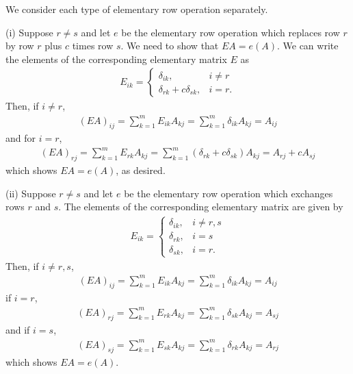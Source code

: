 \documentclass[12pt,letterpaper,reqno]{article}
\numberwithin{equation}{section}
\begin{document}
\begin{pf}
We consider each type of elementary row operation separately.

(i) Suppose $r \neq s$ and let $e$ be the elementary row operation which replaces row $r$ by row $r$ plus $c$ times row $s$. We need to show that $EA=e(A)$. We can write the elements of the corresponding elementary matrix $E$ as 
	 \begin{align*}
	 	E_{ik}=\begin{cases}
	 		\delta_{ik}, &i \neq r \\
	 		\delta_{rk}+c\delta_{sk}, &i=r.
	 	\end{cases}
	 \end{align*}
Then, if $i \neq r$, 
\begin{align*}
	(EA)_{ij}=\sum_{k=1}^m E_{ik}A_{kj} = \sum_{k=1}^m\delta_{ik}A_{kj}=A_{ij}
\end{align*}
and for $i=r$,
\begin{align*}
	(EA)_{rj}=\sum_{k=1}^m E_{rk}A_{kj} =\sum_{k=1}^m(\delta_{rk}+c\delta_{sk})A_{kj} =A_{rj}+cA_{sj}
\end{align*}
which shows $EA=e(A)$, as desired.

(ii) Suppose $r \neq s$ and let $e$ be the elementary row operation which exchanges rows $r$ and $s$. The elements of the corresponding elementary matrix are given by
	 \begin{align*}
	 	E_{ik}=\begin{cases}
	 		\delta_{ik}, &i \neq r,s \\
	 		\delta_{rk}, &i=s \\
	 		\delta_{sk}, &i=r.
	 	\end{cases}
	 \end{align*}
Then, if $i \neq r,s$, 
\begin{align*}
	(EA)_{ij}=\sum_{k=1}^m E_{ik}A_{kj} = \sum_{k=1}^m\delta_{ik}A_{kj}=A_{ij}
\end{align*}
if $i=r$,
\begin{align*}
	(EA)_{rj}=\sum_{k=1}^m E_{rk}A_{kj} =\sum_{k=1}^m\delta_{sk}A_{kj} =A_{sj}
\end{align*}
and if $i=s$,
\begin{align*}
	(EA)_{sj}=\sum_{k=1}^m E_{sk}A_{kj} =\sum_{k=1}^m\delta_{rk}A_{kj} =A_{rj}
\end{align*}
which shows $EA=e(A)$.


\end{pf}
\end{document}
